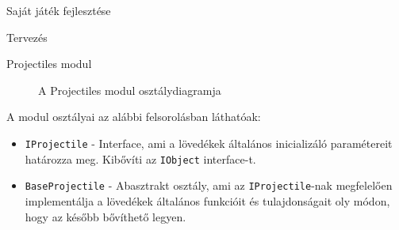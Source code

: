 \begin{MyChapter}{Saját játék fejlesztése}
\begin{MySection}{Tervezés}
\begin{MySubSection}{Projectiles modul}
			\begin{figure}[h!]
				\centering
				\caption{A Projectiles modul osztálydiagramja}
				\label{fig:uml:projectile}
			\end{figure}
			
			A modul osztályai az alábbi felsorolásban láthatóak:
			\begin{itemize}
				\item \texttt{IProjectile} - Interface, ami a lövedékek általános inicializáló paramétereit határozza meg. Kibővíti az \texttt{IObject} interface-t.

				\item \texttt{BaseProjectile} - Abasztrakt osztály, ami az \texttt{IProjectile}-nak megfelelően implementálja a lövedékek általános funkcióit és tulajdonságait oly módon, hogy az később bővíthető legyen.


\end{itemize}
\end{MySubSection}
\end{MySection}
\end{MyChapter}
